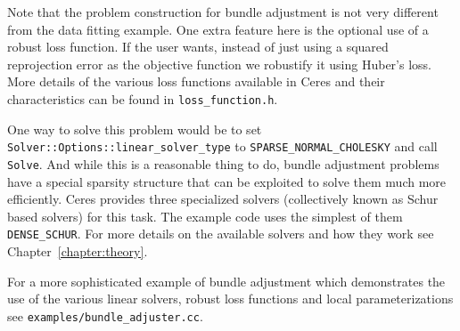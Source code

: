 Note that the problem construction for bundle adjustment is not very
different from the data fitting example. One extra feature here is the
optional use of a robust loss function. If the user wants, instead of just using a squared reprojection error as the objective function we robustify it using Huber's loss. More details of the various loss functions available in Ceres and their characteristics can be found in \texttt{loss\_function.h}.

One way to solve this problem would be to set \texttt{Solver::Options::linear\_solver\_type} to \texttt{SPARSE\_NORMAL\_CHOLESKY} and call \texttt{Solve}. And while this is a reasonable thing to do, bundle adjustment problems have a special sparsity structure that can be exploited to solve them much more efficiently. Ceres provides three specialized solvers (collectively known as Schur based solvers) for this task. The example code uses the simplest of them \texttt{DENSE\_SCHUR}. For more details on the available solvers and how they work see Chapter~\ref{chapter:theory}.

For a more sophisticated example of bundle adjustment which demonstrates the use of the various linear solvers, robust loss functions and local parameterizations see \texttt{examples/bundle\_adjuster.cc}.